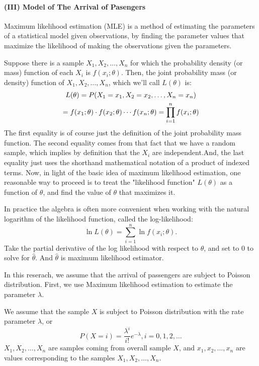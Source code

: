 \documentclass{mcmthesis}
\begin{document}
	\paragraph{(III) Model of The Arrival of Pasengers} \label{flag1.1} %
		Maximum likelihood estimation (MLE) is a method of estimating the parameters of a statistical model given observations, by finding the parameter values that maximize the likelihood of making the observations given the parameters. 

		Suppose there is a sample ${X_1,X_2,\dots,X_n}$ for which the probability density (or mass) function of each ${X_i}$ is ${f(x_i;\theta)}$.  Then, the joint probability mass (or density) function of ${X_1,X_2,\dots,X_n}$, which we'll call ${L(\theta)}$ is:
			\begin{gather}
				L( \theta) = P(X_1 = x_1, X_2 = x_2, \dots, X_n = x_n) \notag \\
				= f(x_1; \theta)\cdot f(x_2; \theta) \cdots f(x_n; \theta) = \prod_{i=1}^{n}f(x_i; \theta) \label{flag1}
			\end{gather}
		The first equality is of course just the definition of the joint probability mass function. The second equality comes from that fact that we have a random sample, which implies by definition that the ${X_i}$ are independent.And, the last equality just uses the shorthand mathematical notation of a product of indexed terms. Now, in light of the basic idea of maximum likelihood estimation, one reasonable way to proceed is to treat the "likelihood function" ${L(\theta)}$ as a function of ${\theta}$, and find the value of ${\theta}$ that maximizes it.

		In practice the algebra is often more convenient when working with the natural logarithm of the likelihood function, called the log-likelihood:
			\begin{equation}
				\ln L(\theta) = \sum_{i=1}^{n}\ln f(x_i;\theta). 
			\end{equation}
		Take the partial derivative of the log likelihood with respect to ${\theta}$, and set to 0 to solve for ${\hat \theta}$. And ${\hat \theta}$ is maximum likelihood estimator.

		In this reserach, we assume that the arrival of passengers are subject to Poisson distribution. First, we use Maximum likelihood estimation to estimate the parameter ${\lambda}$.

		We assume that the sample ${X}$ is subject to Poisson distribution with the rate parameter ${\lambda}$, or
			\begin{equation}
				P(X = i) = \frac {\lambda ^ i}{i!}e^{-\lambda},i=0,1,2,\dots
			\end{equation}
		${X_1, X_2, \dots , X_n}$ are samples coming from overall sample ${X}$, and ${x_1, x_2, \dots , x_n}$ are values corresponding to the samples  ${X_1, X_2, \dots , X_n}$. 
		
\end{document}
